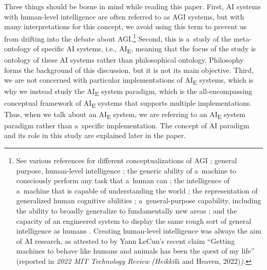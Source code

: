 {{Three things should be borne in mind while reading this paper. First, AI systems with human-level intelligence are often referred to as AGI systems, but with many interpretations for this concept, we avoid using this term to prevent us from drifting into the debate about AGI.\footnote{ See various references for different conceptualizations of AGI
\parencites[e.g.,][p.40]{mitchell_artificial_2019}[][]{fjelland_why_2020}; %
 general purpose, human-level intelligence 
\parencite[][]{marcus_artificial_2022}; %
 the generic ability of a~machine to consciously perform any task that a~human can 
\parencite[][]{swar_unified_2022}; %
 the intelligence of a~machine that is capable of understanding the world 
\parencite[][]{skuza_what_2020}; %
 the representation of generalized human cognitive abilities 
\parencite[][]{lutkevich_what_2022}; %
 a~general-purpose capability, including the ability to broadly generalize to fundamentally new areas 
\parencite[][]{cassimatis_ability_2008}; %
 and the capacity of an engineered system to display the same rough sort of general intelligence as humans 
\parencite[][]{goertzel_artificial_2015}. %
 Creating human-level intelligence was always the aim of AI research, as attested to by Yann LeCun's recent claim ``Getting machines to behave like humans and animals has been the quest of my life'' (reported in \emph{\textup{2022 MIT Technology Review }}\label{ref:RNDzntlMH5EtX}\emph{\textup{(Heikkil}}ä and Heaven, 2022)\emph{\textup{)}.}} Second, this is a~study of the meta-ontology of specific AI systems, i.e., AI\textsubscript{E}, meaning that the focus of the study is ontology of these AI systems rather than philosophical ontology. Philosophy forms the background of this discussion, but it is not its main objective. Third, we are not concerned with particular implementations of AI\textsubscript{E} systems, which is why we instead study the AI\textsubscript{E} system paradigm, which is the all-encompassing conceptual framework of AI\textsubscript{E} systems that supports multiple implementations. Thus, when we talk about an AI\textsubscript{E} system, we are referring to an AI\textsubscript{E} system paradigm rather than a~specific implementation. The concept of AI paradigm and its role in this study are explained later in the paper.

}}
